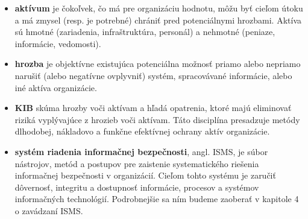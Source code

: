 \begin{itemize}

\item \textbf{aktívum} je čokoľvek, čo má pre organizáciu hodnotu, môžu byť cieľom útoku a má zmysel (resp. je potrebné) chrániť
pred potenciálnymi hrozbami. Aktíva sú hmotné (zariadenia, infraštruktúra, personál) a nehmotné (peniaze, informácie, vedomosti).

\item \textbf{hrozba} je objektívne existujúca potenciálna možnosť priamo alebo nepriamo narušiť (alebo negatívne ovplyvniť) 
systém, spracovávané informácie, alebo iné aktíva organizácie.

\item \textbf{\acrfull{KIB}} skúma hrozby voči aktívam a hľadá opatrenia, ktoré majú
eliminovať riziká vyplývajúce z hrozieb voči aktívam. Táto disciplína presadzuje metódy dlhodobej, nákladovo a funkčne efektívnej
ochrany aktív organizácie.

\item \textbf{systém riadenia informačnej bezpečnosti}, angl. \acrfull{ISMS}, je súbor nástrojov, metód a postupov pre zaistenie
systematického riešenia informačnej bezpečnosti v organizácií. Cieľom tohto systému je zaručiť dôvernosť, integritu a dostupnosť
informácie, procesov a systémov informačných technológií. Podrobnejšie sa ním budeme zaoberať v kapitole 4 o zavádzaní ISMS.

\end{itemize}
